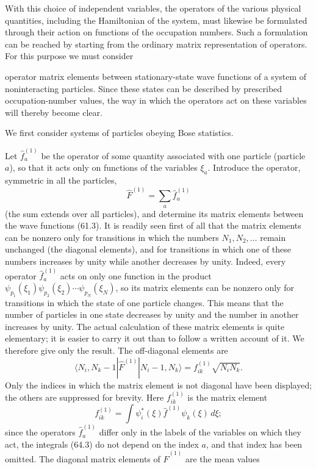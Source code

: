 With this choice of independent variables, the operators of the various physical quantities, including the Hamiltonian of the system, must likewise be formulated through their action on functions of the occupation numbers. Such a formulation can be reached by starting from the ordinary matrix representation of operators. For this purpose we must consider

operator matrix elements between stationary-state wave functions of a system of noninteracting particles. Since these states can be described by prescribed occupation-number values, the way in which the operators act on these variables will thereby become clear.

We first consider systems of particles obeying Bose statistics.

Let $\hat f_a^{(1)}$ be the operator of some quantity associated with one particle (particle $a$), so that it acts only on functions of the variables $\xi_a$. Introduce the operator, symmetric in all the particles,
\begin{equation}
 \hat F^{(1)}=\sum_a\hat f_a^{(1)}
 \tag{64.1}
\end{equation}
(the sum extends over all particles), and determine its matrix elements between the wave functions (61.3). It is readily seen first of all that the matrix elements can be nonzero only for transitions in which the numbers $N_1,N_2,\ldots$ remain unchanged (the diagonal elements), and for transitions in which one of these numbers increases by unity while another decreases by unity. Indeed, every operator $\hat f_a^{(1)}$ acts on only one function in the product $\psi_{p_1}(\xi_1)\psi_{p_2}(\xi_2)\cdots\psi_{p_N}(\xi_N)$, so its matrix elements can be nonzero only for transitions in which the state of one particle changes. This means that the number of particles in one state decreases by unity and the number in another increases by unity. The actual calculation of these matrix elements is quite elementary; it is easier to carry it out than to follow a written account of it. We therefore give only the result. The off-diagonal elements are
\begin{equation}
 \langle N_i,N_k-1|\hat F^{(1)}|N_i-1,N_k\rangle
 =f_{ik}^{(1)}\sqrt{N_iN_k}.
 \tag{64.2}
\end{equation}
Only the indices in which the matrix element is not diagonal have been displayed; the others are suppressed for brevity. Here $f_{ik}^{(1)}$ is the matrix element
\begin{equation}
 f_{ik}^{(1)}=\int\psi_i^*(\xi)\hat f^{(1)}\psi_k(\xi)\,d\xi;
 \tag{64.3}
\end{equation}
since the operators $\hat f_a^{(1)}$ differ only in the labels of the variables on which they act, the integrals (64.3) do not depend on the index $a$, and that index has been omitted. The diagonal matrix elements of $\hat F^{(1)}$ are the mean values


